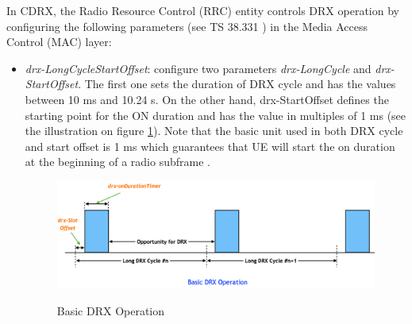 \documentclass[conference]{IEEEtran}
\begin{document}
    In CDRX, the Radio Resource Control (RRC) entity controls DRX operation by configuring the following parameters (see TS 38.331 \cite{3gpp_nr_nodate-3_38.331}) in the Media Access Control (MAC) layer:

\begin{itemize}
    \item \textit{drx-LongCycleStartOffset}: configure two parameters \textit{drx-LongCycle} and \textit{drx-StartOffset}. The first one sets the duration of DRX cycle and has the values between 10 ms and 10.24 s. On the other hand, drx-StartOffset defines the starting point for the ON duration and has the value in multiples of 1 ms (see the illustration on figure \ref{fig:basic-drx-operation}). Note that the basic unit used in both DRX cycle and start offset is 1 ms which guarantees that UE will start the on duration at the beginning of a radio subframe .

\begin{figure}
    \centering
    \includegraphics[width=\linewidth]{Pictures/Basic DRX Operation.png}
    \label{fig:basic-drx-operation}
    \caption{Basic DRX Operation}
\end{figure}
    

\end{itemize}
\end{document}
